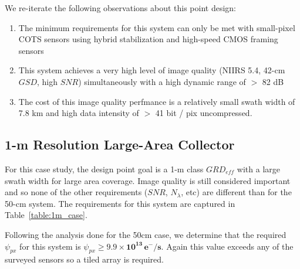 \documentclass[]{spieman}  %
\begin{document}
We re-iterate the following observations about this point design:

\begin{enumerate}
    \item The minimum requirements for this system can only be met with small-pixel COTS sensors using hybrid stabilization and high-speed CMOS framing sensors
    \item This system achieves a very high level of image quality (NIIRS 5.4, 42-cm $GSD$, high $SNR$) simultaneously with a high dynamic range of $>$ 82 dB
    \item The cost of this image quality perfmance is a relatively small swath width of 7.8 km and high data intensity of $>$ 41 bit / pix uncompressed.
\end{enumerate}

\subsection{1-m Resolution Large-Area Collector}

For this case study, the design point goal is a 1-m class $GRD_{eff}$ with a large swath width for large area coverage.  Image quality is still considered important and so none of the other requirements ($SNR$, $N_\lambda$, etc) are different than for the 50-cm system.  The requirements for this system are captured in Table~\ref{table:1m_case}. 

\begin{table}[h!]
\centering
{}
\caption{Specification for 1-m large-area collector.}
\label{table:1m_case}
\end{table}

Following the analysis done for the 50cm case, we determine that the required $\psi_{px}$ for this system is $\psi_{px} \geq \mathbf{9.9 \times 10^{13} \, e^-/s}$.  Again this value exceeds any of the surveyed sensors so a tiled array is required.  
\end{document}
